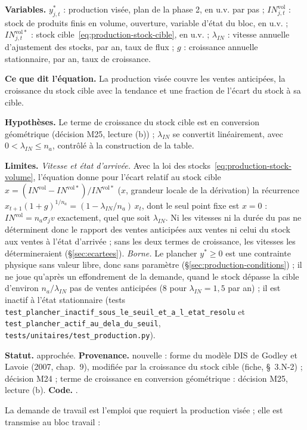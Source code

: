 \documentclass[11pt,a4paper]{article}
\newcommand{\variables}{\par\noindent\textbf{Variables.} }
\newcommand{\sens}{\par\noindent\textbf{Ce que dit l'équation.} }
\newcommand{\hyp}{\par\noindent\textbf{Hypothèses.} }
\newcommand{\limites}{\par\noindent\textbf{Limites.} }
\newcommand{\code}[1]{\texttt{\detokenize{#1}}}
\newcommand{\tracabilite}[3]{\par\smallskip\noindent\textbf{Statut.} #1. \textbf{Provenance.} #2. \textbf{Code.} \code{#3}.}
\begin{document}
\begin{lecture}
\variables $y^{\ast}_{j,t}$ : production visée, plan de la phase 2, en u.v. par pas ; $\mathit{IN}^{\mathrm{vol}}_{j,t}$ : stock de produits finis en volume, ouverture, variable d'état du bloc, en u.v. ; $\mathit{IN}^{\mathrm{vol}\ast}_{j,t}$ : stock cible~\eqref{eq:production-stock-cible}, en u.v. ; $\lambda_{\mathit{IN}}$ : vitesse annuelle d'ajustement des stocks, par an, taux de flux ; $g$ : croissance annuelle stationnaire, par an, taux de croissance.
\sens La production visée couvre les ventes anticipées, la croissance du stock cible avec la tendance et une fraction de l'écart du stock à sa cible.
\hyp Le terme de croissance du stock cible est en conversion géométrique (décision M25, lecture (b)) ; $\lambda_{\mathit{IN}}$ se convertit linéairement, avec $0 < \lambda_{\mathit{IN}} \le n_a$, contrôlé à la construction de la table.
\limites \emph{Vitesse et état d'arrivée.} Avec la loi des stocks~\eqref{eq:production-stock-volume}, l'équation donne pour l'écart relatif au stock cible $x = (\mathit{IN}^{\mathrm{vol}} - \mathit{IN}^{\mathrm{vol}\ast})/\mathit{IN}^{\mathrm{vol}\ast}$ ($x$, grandeur locale de la dérivation) la récurrence $x_{t+1}(1 + g)^{1/n_a} = (1 - \lambda_{\mathit{IN}}/n_a)\,x_t$, dont le seul point fixe est $x = 0$ : $\mathit{IN}^{\mathrm{vol}} = n_a \sigma_j v$ exactement, quel que soit $\lambda_{\mathit{IN}}$. Ni les vitesses ni la durée du pas ne déterminent donc le rapport des ventes anticipées aux ventes ni celui du stock aux ventes à l'état d'arrivée ; sans les deux termes de croissance, les vitesses les détermineraient (\S\ref{sec:ecartees}). \emph{Borne.} Le plancher $y^{\ast} \ge 0$ est une contrainte physique sans valeur libre, donc sans paramètre (\S\ref{sec:production-conditions}) ; il ne joue qu'après un effondrement de la demande, quand le stock dépasse la cible d'environ $n_a/\lambda_{\mathit{IN}}$ pas de ventes anticipées (8 pour $\lambda_{\mathit{IN}} = 1{,}5$ par an) ; il est inactif à l'état stationnaire (tests \nolinkurl{test_plancher_inactif_sous_le_seuil_et_a_l_etat_resolu} et \nolinkurl{test_plancher_actif_au_dela_du_seuil}, \nolinkurl{tests/unitaires/test_production.py}).
\tracabilite{approchée}{nouvelle : forme du modèle DIS de Godley et Lavoie (2007, chap.~9), modifiée par la croissance du stock cible (fiche, \S~3.N-2) ; décision M24 ; terme de croissance en conversion géométrique : décision M25, lecture (b)}{nations.blocs.production.production_visee}
\end{lecture}
La demande de travail est l'emploi que requiert la production visée ; elle est transmise au bloc travail :
\end{document}
